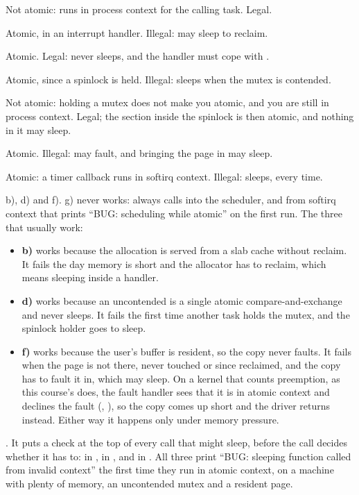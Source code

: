  Not atomic:  runs in process context for the calling task. Legal.

 Atomic, in an interrupt handler. Illegal:  may sleep to reclaim.

 Atomic. Legal:  never sleeps, and the handler must cope with
.

 Atomic, since a spinlock is held. Illegal:  sleeps when the mutex is
contended.

 Not atomic: holding a mutex does not make you atomic, and you are still in process context.
Legal; the section inside the spinlock is then atomic, and nothing in it may sleep.

 Atomic. Illegal:  may fault, and bringing the page in may sleep.

 Atomic: a timer callback runs in softirq context. Illegal:  sleeps, every
time.

 b), d) and f). g) never works:  always calls into the scheduler, and from
softirq context that prints ``BUG: scheduling while atomic'' on the first run. The three that
usually work:
\begin{itemize}
  \item \textbf{b)} works because the allocation is served from a slab cache without reclaim. It
    fails the day memory is short and the allocator has to reclaim, which means sleeping inside a
    handler.
  \item \textbf{d)} works because an uncontended  is a single atomic
    compare-and-exchange and never sleeps. It fails the first time another task holds the mutex,
    and the spinlock holder goes to sleep.
  \item \textbf{f)} works because the user's buffer is resident, so the copy never faults. It fails
    when the page is not there, never touched or since reclaimed, and the copy has to fault it in,
    which may sleep. On a kernel that counts preemption, as this course's does, the fault handler
    sees that it is in atomic context and declines the fault (,
    ), so the copy comes up short and the driver returns
     instead. Either way it happens only under memory pressure.
\end{itemize}

 . It puts a check at the top of every call that might
sleep, before the call decides whether it has to:  in ,
 in , and  in . All
three print ``BUG: sleeping function called from invalid context'' the first time they run in
atomic context, on a machine with plenty of memory, an uncontended mutex and a resident page.

